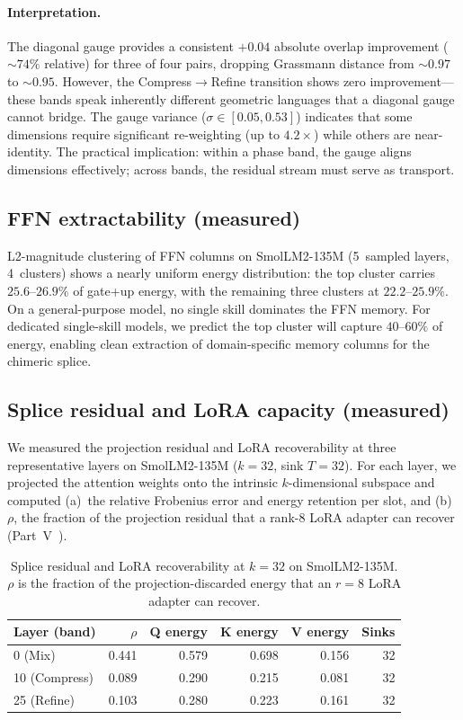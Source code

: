 \documentclass[11pt]{article}
\begin{document}
\paragraph{Interpretation.}  The diagonal gauge provides a consistent
$+0.04$ absolute overlap improvement (${\sim}74\%$ relative) for three
of four pairs, dropping Grassmann distance from ${\sim}0.97$ to
${\sim}0.95$.  However, the Compress$\to$Refine transition shows
zero improvement---these bands speak inherently different
geometric languages that a diagonal gauge cannot bridge.  The gauge
variance ($\sigma{\in}[0.05,0.53]$) indicates that some dimensions
require significant re-weighting (up to $4.2\times$) while others
are near-identity.  The practical implication: within a phase band,
the gauge aligns dimensions effectively; across bands, the residual
stream must serve as transport.

\subsection{FFN extractability (measured)}

L2-magnitude clustering of FFN columns on SmolLM2-135M (5~sampled
layers, 4~clusters) shows a nearly uniform energy distribution:
the top cluster carries $25.6$--$26.9\%$ of gate+up energy, with
the remaining three clusters at $22.2$--$25.9\%$.  On a
general-purpose model, no single skill dominates the FFN memory.
For dedicated single-skill models, we predict the top cluster will
capture $40$--$60\%$ of energy, enabling clean extraction of
domain-specific memory columns for the chimeric splice.

\subsection{Splice residual and LoRA capacity (measured)}

We measured the projection residual and LoRA recoverability at three
representative layers on SmolLM2-135M ($k{=}32$, sink $T{=}32$).
For each layer, we projected the attention weights onto the intrinsic
$k$-dimensional subspace and computed (a)~the relative Frobenius error
and energy retention per slot, and (b)~$\rho$, the fraction of the
projection residual that a rank-$8$ LoRA adapter can recover
(Part~V~\cite{stewart2026distill}).

\begin{table}[h]\centering\small
\caption{Splice residual and LoRA recoverability at $k{=}32$ on
SmolLM2-135M.  $\rho$ is the fraction of the projection-discarded
energy that an $r{=}8$ LoRA adapter can recover.}
\label{tab:splice-residual}
\begin{tabular}{@{}lrrrrr@{}}
\toprule
Layer (band) & $\rho$ & Q energy & K energy & V energy & Sinks \\
\midrule
0  (Mix)     & 0.441 & 0.579 & 0.698 & 0.156 & 32 \\
10 (Compress) & 0.089 & 0.290 & 0.215 & 0.081 & 32 \\
25 (Refine)   & 0.103 & 0.280 & 0.223 & 0.161 & 32 \\
\bottomrule
\end{tabular}
\end{table}
\end{document}

